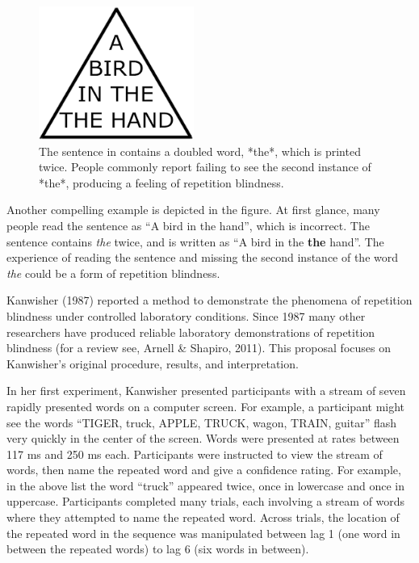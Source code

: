 \documentclass[
  man,floatsintext]{apa6}
\begin{document}
\begin{figure}

{\centering \includegraphics[width=2in]{bird_in_the_the_hand} 

}

\caption{The sentence in contains a doubled word, *the*, which is printed twice. People commonly report failing to see the second instance of *the*, producing a feeling of repetition blindness.}\label{fig:bird}
\end{figure}

Another compelling example is depicted in the figure. At first glance, many people read the sentence as ``A bird in the hand'', which is incorrect. The sentence contains \emph{the} twice, and is written as ``A bird in the \textbf{the} hand''. The experience of reading the sentence and missing the second instance of the word \emph{the} could be a form of repetition blindness.

Kanwisher (1987) reported a method to demonstrate the phenomena of repetition blindness under controlled laboratory conditions. Since 1987 many other researchers have produced reliable laboratory demonstrations of repetition blindness (for a review see, Arnell \& Shapiro, 2011). This proposal focuses on Kanwisher's original procedure, results, and interpretation.

In her first experiment, Kanwisher presented participants with a stream of seven rapidly presented words on a computer screen. For example, a participant might see the words ``TIGER, truck, APPLE, TRUCK, wagon, TRAIN, guitar'' flash very quickly in the center of the screen. Words were presented at rates between 117 ms and 250 ms each. Participants were instructed to view the stream of words, then name the repeated word and give a confidence rating. For example, in the above list the word ``truck'' appeared twice, once in lowercase and once in uppercase. Participants completed many trials, each involving a stream of words where they attempted to name the repeated word. Across trials, the location of the repeated word in the sequence was manipulated between lag 1 (one word in between the repeated words) to lag 6 (six words in between).
\end{document}

